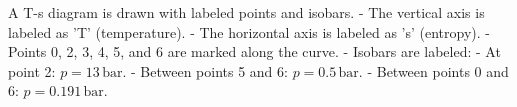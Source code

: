 A T-s diagram is drawn with labeled points and isobars.  
- The vertical axis is labeled as 'T' (temperature).  
- The horizontal axis is labeled as 's' (entropy).  
- Points 0, 2, 3, 4, 5, and 6 are marked along the curve.  
- Isobars are labeled:  
  - At point 2: \( p = 13 \, \text{bar} \).  
  - Between points 5 and 6: \( p = 0.5 \, \text{bar} \).  
  - Between points 0 and 6: \( p = 0.191 \, \text{bar} \).